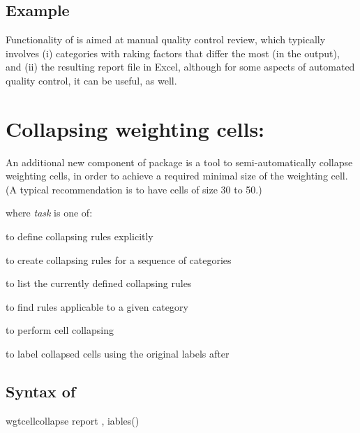 \subsection{Example}

\begin{stlog}
\nullskip
\end{stlog}

Functionality of  is aimed at manual quality control review,
which typically involves (i) categories with raking factors that differ the most (in the output),
and (ii) the resulting report file in Excel,
although for some aspects of automated quality control, it can be useful, as well.

\section{Collapsing weighting cells:  }

An additional new component of  package is a tool to
semi-automatically collapse weighting cells, in order to achieve
a required minimal size of the weighting cell. (A typical recommendation
is to have cells of size 30 to 50.)

\begin{stsyntax}
wgtcellcollapse \textit{task}
\optif\
\optin\
,
}
\end{stsyntax}

where \textit{task} is one of:

\hangpara
{} to define collapsing rules explicitly

\hangpara
{} to create collapsing rules for a sequence of categories

\hangpara
{} to list the currently defined collapsing rules

\hangpara
{} to find rules applicable to a given category

\hangpara
{} to perform cell collapsing

\hangpara
{} to label collapsed cells using the original labels after 

\subsection{Syntax of \stcmd{wgtcellcollapse report}}

\begin{stsyntax}
wgtcellcollapse report
,
iables(\varlist)
\end{stsyntax}

